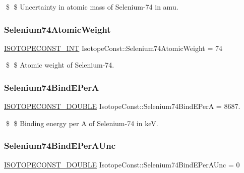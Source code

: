 \$ \$ Uncertainty in atomic mass of Selenium-\/74 in amu. \mbox{\label{group___isotope_const-_selenium-_se74_gafb65c9e28d1c73270668d6d202d500e6}} 
\subsubsection{\texorpdfstring{Selenium74\+Atomic\+Weight}{Selenium74AtomicWeight}}
{\footnotesize\ttfamily \mbox{\hyperlink{group___isotope_const-_macros_ga5f18360b3e99483a35c32d789e62621c}{I\+S\+O\+T\+O\+P\+E\+C\+O\+N\+S\+T\+\_\+\+I\+NT}} Isotope\+Const\+::\+Selenium74\+Atomic\+Weight = 74}

\$ \$ Atomic weight of Selenium-\/74. \mbox{\label{group___isotope_const-_selenium-_se74_gac20c05f47e20ad1ac8000751b553c028}} 
\subsubsection{\texorpdfstring{Selenium74\+Bind\+E\+PerA}{Selenium74BindEPerA}}
{\footnotesize\ttfamily \mbox{\hyperlink{group___isotope_const-_macros_ga8f45a7272ce02c0b4c65c44636ed719a}{I\+S\+O\+T\+O\+P\+E\+C\+O\+N\+S\+T\+\_\+\+D\+O\+U\+B\+LE}} Isotope\+Const\+::\+Selenium74\+Bind\+E\+PerA = 8687.}

\$ \$ Binding energy per A of Selenium-\/74 in keV. \mbox{\label{group___isotope_const-_selenium-_se74_gae6197db2c61d41e96ad62cca109383d0}} 
\subsubsection{\texorpdfstring{Selenium74\+Bind\+E\+Per\+A\+Unc}{Selenium74BindEPerAUnc}}
{\footnotesize\ttfamily \mbox{\hyperlink{group___isotope_const-_macros_ga8f45a7272ce02c0b4c65c44636ed719a}{I\+S\+O\+T\+O\+P\+E\+C\+O\+N\+S\+T\+\_\+\+D\+O\+U\+B\+LE}} Isotope\+Const\+::\+Selenium74\+Bind\+E\+Per\+A\+Unc = 0}

